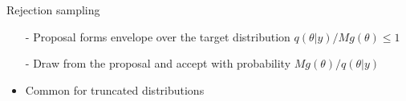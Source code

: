 \documentclass[finnish,english,t]{beamer}
\begin{document}
\begin{frame}
  
  {\Large\color{navyblue} Rejection sampling}

    \vspace{-.3\baselineskip}
  \begin{itemize}
  \item[-] Proposal forms envelope over the target distribution ${q(\theta|y)}/{M g(\theta)} \leq 1$
  \item[-] Draw from the proposal and accept with probability ${M g(\theta)}/{q(\theta|y)}$
  \item<3>[-] Common for truncated distributions
  \end{itemize}
  \begin{center}
    \vspace{-1.6\baselineskip}
  \end{center}

\end{frame}
\end{document}
